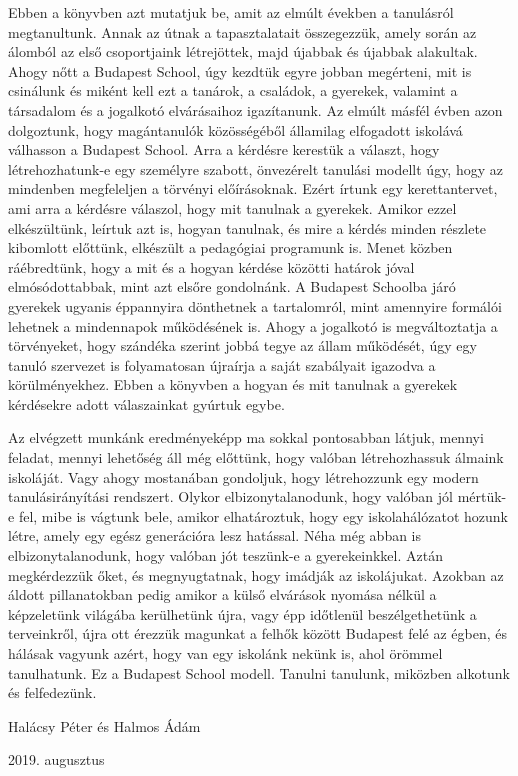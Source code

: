 Ebben a könyvben azt mutatjuk be, amit az elmúlt években a tanulásról megtanultunk. Annak az útnak a tapasztalatait összegezzük, amely során az álomból az első csoportjaink létrejöttek, majd újabbak és újabbak alakultak. Ahogy nőtt a Budapest School, úgy kezdtük egyre jobban megérteni, mit is csinálunk és miként kell ezt a tanárok, a családok, a gyerekek, valamint a társadalom és a jogalkotó elvárásaihoz igazítanunk. Az elmúlt másfél évben azon dolgoztunk, hogy magántanulók közösségéből államilag elfogadott iskolává válhasson a Budapest School. Arra a kérdésre kerestük a választ, hogy létrehozhatunk-e  egy személyre szabott, önvezérelt tanulási modellt úgy, hogy az mindenben megfeleljen a törvényi előírásoknak. Ezért írtunk egy kerettantervet, ami arra a kérdésre válaszol, hogy mit tanulnak a gyerekek. Amikor ezzel elkészültünk, leírtuk azt is, hogyan tanulnak, és mire a kérdés minden részlete kibomlott előttünk, elkészült a pedagógiai programunk is. Menet közben ráébredtünk, hogy a mit és a hogyan kérdése közötti határok jóval elmósódottabbak, mint azt elsőre gondolnánk. A Budapest Schoolba járó gyerekek ugyanis éppannyira dönthetnek a tartalomról, mint amennyire formálói lehetnek a mindennapok működésének is. Ahogy a jogalkotó is megváltoztatja a törvényeket, hogy szándéka szerint jobbá tegye az állam működését, úgy egy tanuló szervezet is folyamatosan újraírja a saját szabályait igazodva a körülményekhez. Ebben a könyvben a hogyan és mit tanulnak a gyerekek kérdésekre adott válaszainkat gyúrtuk egybe.

Az elvégzett munkánk eredményeképp ma sokkal pontosabban látjuk, mennyi feladat, mennyi lehetőség áll még előttünk, hogy valóban létrehozhassuk álmaink iskoláját. Vagy ahogy mostanában gondoljuk, hogy létrehozzunk egy modern tanulásirányítási rendszert. Olykor elbizonytalanodunk, hogy valóban jól mértük-e fel, mibe is vágtunk bele, amikor elhatároztuk, hogy egy iskolahálózatot hozunk létre, amely egy egész generációra lesz hatással. Néha még abban is elbizonytalanodunk, hogy valóban jót teszünk-e a gyerekeinkkel. Aztán megkérdezzük őket, és megnyugtatnak, hogy imádják az iskolájukat. Azokban az áldott pillanatokban pedig amikor a külső elvárások nyomása nélkül a képzeletünk világába kerülhetünk újra, vagy épp időtlenül beszélgethetünk a terveinkről, újra ott érezzük magunkat a felhők között Budapest felé az égben, és hálásak vagyunk azért, hogy van egy iskolánk nekünk is, ahol örömmel tanulhatunk. Ez a Budapest School modell. Tanulni tanulunk, miközben alkotunk és felfedezünk. 

\bigskip
\raggedright Halácsy Péter és Halmos Ádám\\
\raggedright 2019. augusztus